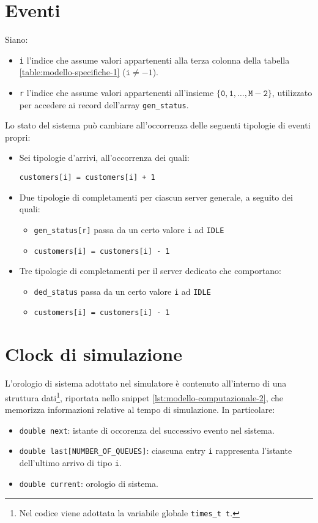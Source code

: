 \section{Eventi}\label{sec:modello-computazionale-eventi}
Siano:
\begin{itemize}
\item \texttt{i} l'indice che assume valori appartenenti alla terza colonna della tabella \ref{table:modello-specifiche-1} ($\mathtt{i} \neq -1$).
\item \texttt{r} l'indice che assume valori appartenenti all'insieme $\mathtt{\lbrace 0, 1, \dots, M - 2 \rbrace}$, utilizzato per accedere ai record dell'array \texttt{gen\_status}.
\end{itemize}
Lo stato del sistema può cambiare all'occorrenza delle seguenti tipologie di eventi propri:
\begin{itemize}
\item Sei tipologie d'arrivi, all'occorrenza dei quali:
\begin{center}
\texttt{customers[i] = customers[i] + 1}
\end{center}
\item Due tipologie di completamenti per ciascun server generale, a seguito dei quali:
\begin{itemize}
\item \texttt{gen\_status[r]} passa da un certo valore \texttt{i} ad \texttt{IDLE}
\item \texttt{customers[i] = customers[i] - 1}
\end{itemize}
\item Tre tipologie di completamenti per il server dedicato che comportano:
\begin{itemize}
\item \texttt{ded\_status} passa da un certo valore \texttt{i} ad \texttt{IDLE}
\item \texttt{customers[i] = customers[i] - 1}
\end{itemize}
\end{itemize} 
\section{Clock di simulazione}\label{sec:modello-computazionale-clock}
L'orologio di sistema adottato nel simulatore è contenuto all'interno di una struttura dati\footnote{Nel codice viene adottata la variabile globale \texttt{{\color{code_purple}times\_t} t}.}, riportata nello snippet \ref{lst:modello-computazionale-2}, che memorizza informazioni relative al tempo di simulazione. In particolare:
\begin{itemize}
\item \texttt{{\color{code_purple}double} next}: istante di occorenza del successivo evento nel sistema.
\item \texttt{{\color{code_purple}double} last[NUMBER\_OF\_QUEUES]}: ciascuna entry \texttt{i} rappresenta l'istante dell'ultimo arrivo di tipo \texttt{i}.
\item \texttt{{\color{code_purple}double} current}: orologio di sistema.
\end{itemize}

